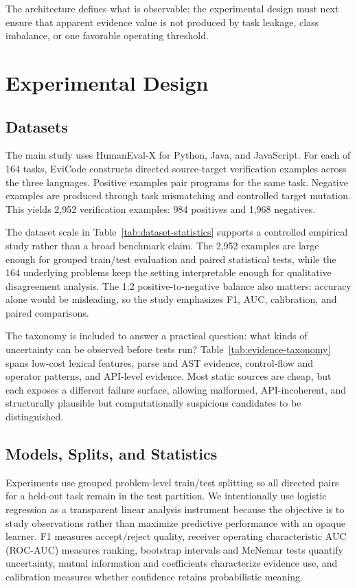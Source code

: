 ﻿\documentclass[conference]{IEEEtran}
\begin{document}
The architecture defines what is observable; the experimental design must next ensure that apparent evidence value is not produced by task leakage, class imbalance, or one favorable operating threshold.

\section{Experimental Design}
\subsection{Datasets}
The main study uses HumanEval-X for Python, Java, and JavaScript. For each of 164 tasks, EviCode constructs directed source-target verification examples across the three languages. Positive examples pair programs for the same task. Negative examples are produced through task mismatching and controlled target mutation. This yields 2,952 verification examples: 984 positives and 1,968 negatives.


The dataset scale in Table~\ref{tab:dataset-statistics} supports a controlled empirical study rather than a broad benchmark claim. The 2,952 examples are large enough for grouped train/test evaluation and paired statistical tests, while the 164 underlying problems keep the setting interpretable enough for qualitative disagreement analysis. The 1:2 positive-to-negative balance also matters: accuracy alone would be misleading, so the study emphasizes F1, AUC, calibration, and paired comparisons.

The taxonomy is included to answer a practical question: what kinds of uncertainty can be observed before tests run? Table~\ref{tab:evidence-taxonomy} spans low-cost lexical features, parse and AST evidence, control-flow and operator patterns, and API-level evidence. Most static sources are cheap, but each exposes a different failure surface, allowing malformed, API-incoherent, and structurally plausible but computationally suspicious candidates to be distinguished.

\subsection{Models, Splits, and Statistics}
Experiments use grouped problem-level train/test splitting so all directed pairs for a held-out task remain in the test partition. We intentionally use logistic regression as a transparent linear analysis instrument because the objective is to study observations rather than maximize predictive performance with an opaque learner. F1 measures accept/reject quality, receiver operating characteristic AUC (ROC-AUC) measures ranking, bootstrap intervals and McNemar tests quantify uncertainty, mutual information and coefficients characterize evidence use, and calibration measures whether confidence retains probabilistic meaning.
\end{document}
